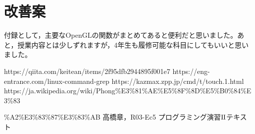 \documentclass[]{jsarticle}
\begin{document}
\section{改善案}
付録として，主要なOpenGLの関数がまとめてあると便利だと思いました。あと，授業内容とは少しずれますが，4年生も履修可能な科目にしてもいいと思いました。
\begin{thebibliography}{99}
 https://qiita.com/keitean/items/2f95dfb2944895f001e7
 https://eng-entrance.com/linux-command-grep
 https://kazmax.zpp.jp/cmd/t/touch.1.html
 https://ja.wikipedia.org/wiki/Phong\%E3\%81\%AE\%E5\%8F\%8D\%E5\%B0\%84\%E3\%83

\%A2\%E3\%83\%87\%E3\%83\%AB
 高橋章，R03-Ec5 プログラミング演習$\rm I\hspace{-.01em}I$テキスト
\end{thebibliography}
\end{document}
